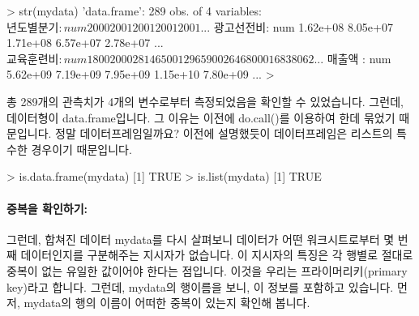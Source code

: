 \begin{Schunk}
\begin{Soutput}
> str(mydata)
'data.frame':	289 obs. of  4 variables:
 $ 년도별분기: num  2000 2001 2001 2001 2001 ...
 $ 광고선전비: num  1.62e+08 8.05e+07 1.71e+08 6.57e+07 2.78e+07 ...
 $ 교육훈련비: num  18002000 28146500 12965900 26468000 16838062 ...
 $ 매출액    : num  5.62e+09 7.19e+09 7.95e+09 1.15e+10 7.80e+09 ...
> 
\end{Soutput}
\end{Schunk}

총 289개의 관측치가 4개의 변수로부터 측정되었음을 확인할 수 있었습니다. 
그런데, 데이터형이 data.frame입니다.  
그 이유는 이전에  do.call()를 이용하여 한데 묶었기 때문입니다.
정말 데이터프레임일까요?  이전에 설명했듯이 데이터프레임은 리스트의 특수한 경우이기 때문입니다.

\begin{Schunk}
\begin{Soutput}
> is.data.frame(mydata)
[1] TRUE
> is.list(mydata)
[1] TRUE
\end{Soutput}
\end{Schunk}

\paragraph{중복을 확인하기:}
그런데, 합쳐진 데이터 mydata를 다시 살펴보니 데이터가 어떤 워크시트로부터 몇 번째 데이터인지를 구분해주는 지시자가 없습니다.
이 지시자의 특징은 각 행별로 절대로 중복이 없는 유일한 값이어야 한다는 점입니다.
이것을 우리는 프라이머리키(primary key)라고 합니다. 
그런데, mydata의 행이름을 보니, 이 정보를 포함하고 있습니다.
먼저, mydata의 행의 이름이 어떠한 중복이 있는지 확인해 봅니다.

